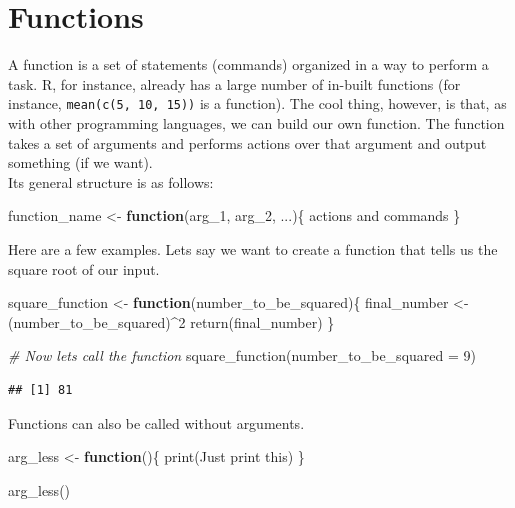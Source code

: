 \documentclass[
]{book}
\newenvironment{Shaded}{\begin{snugshade}}{\end{snugshade}}
\newcommand{\AttributeTok}[1]{\textcolor[rgb]{0.77,0.63,0.00}{#1}}
\newcommand{\CommentTok}[1]{\textcolor[rgb]{0.56,0.35,0.01}{\textit{#1}}}
\newcommand{\ControlFlowTok}[1]{\textcolor[rgb]{0.13,0.29,0.53}{\textbf{#1}}}
\newcommand{\DecValTok}[1]{\textcolor[rgb]{0.00,0.00,0.81}{#1}}
\newcommand{\FunctionTok}[1]{\textcolor[rgb]{0.00,0.00,0.00}{#1}}
\newcommand{\NormalTok}[1]{#1}
\newcommand{\OtherTok}[1]{\textcolor[rgb]{0.56,0.35,0.01}{#1}}
\newcommand{\SpecialCharTok}[1]{\textcolor[rgb]{0.00,0.00,0.00}{#1}}
\newcommand{\StringTok}[1]{\textcolor[rgb]{0.31,0.60,0.02}{#1}}
\begin{document}
\hypertarget{functions}{%
\section{Functions}\label{functions}}

A function is a set of statements (commands) organized in a way to perform a task.
R, for instance, already has a large number of in-built functions (for instance, \texttt{mean(c(5,\ 10,\ 15))} is a function).
The cool thing, however, is that, as with other programming languages, we can build our own function.
The function takes a set of arguments and performs actions over that argument and output something (if we want).\\
Its general structure is as follows:

\begin{Shaded}
\begin{Highlighting}[]
\NormalTok{function\_name }\OtherTok{\textless{}{-}} \ControlFlowTok{function}\NormalTok{(arg\_1, arg\_2, ...)\{}
\NormalTok{   actions and commands}
\NormalTok{\}}
\end{Highlighting}
\end{Shaded}

Here are a few examples.
Lets say we want to create a function that tells us the square root of our input.

\begin{Shaded}
\begin{Highlighting}[]
\NormalTok{square\_function }\OtherTok{\textless{}{-}} \ControlFlowTok{function}\NormalTok{(number\_to\_be\_squared)\{}
\NormalTok{  final\_number }\OtherTok{\textless{}{-}}\NormalTok{ (number\_to\_be\_squared)}\SpecialCharTok{\^{}}\DecValTok{2}
  \FunctionTok{return}\NormalTok{(final\_number)}
\NormalTok{\}}

\CommentTok{\# Now lets call the function}
\FunctionTok{square\_function}\NormalTok{(}\AttributeTok{number\_to\_be\_squared =} \DecValTok{9}\NormalTok{)}
\end{Highlighting}
\end{Shaded}

\begin{verbatim}
## [1] 81
\end{verbatim}

Functions can also be called without arguments.

\begin{Shaded}
\begin{Highlighting}[]
\NormalTok{arg\_less }\OtherTok{\textless{}{-}} \ControlFlowTok{function}\NormalTok{()\{}
  \FunctionTok{print}\NormalTok{(}\StringTok{\textquotesingle{}Just print this\textquotesingle{}}\NormalTok{)}
\NormalTok{\}}

\FunctionTok{arg\_less}\NormalTok{()}
\end{Highlighting}
\end{Shaded}
\end{document}
